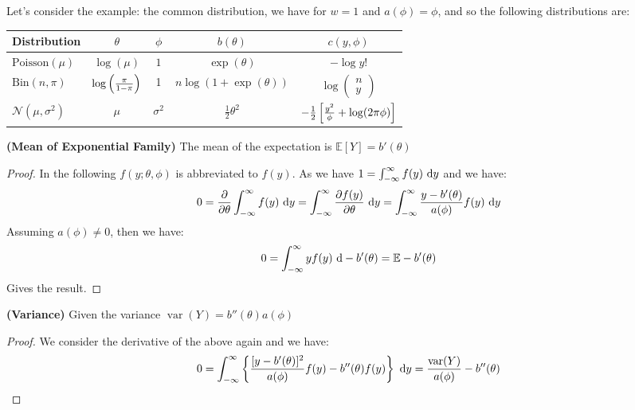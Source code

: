\begin{remark}
    Let's consider the example: the common distribution, we have for $w=1$ and $a(\phi) = \phi$, and so the following distributions are:
    \begin{table}[H]
    \centering
    \begin{tabular}{lcccc}
        \toprule
        \textbf{Distribution}   & $\theta$  & $\phi$ &  $b(\theta)$  & $c(y, \phi)$ \\
        \midrule
        $\text{Poisson}(\mu)$ & $\log(\mu)$ & $1$ & $\exp(\theta)$ & $-\log y !$ \\
        $\text{Bin}(n, \pi)$ & $\log\left( \frac{\pi}{1-\pi} \right)$ & 1 & $n\log(1+\exp(\theta))$ & $\log\begin{pmatrix}
            n \\ y
        \end{pmatrix}$ \\
        $\mathcal{N}(\mu, \sigma^2)$ & $\mu$ & $\sigma^2$ & $\frac{1}{2}\theta^2$ & $-\frac{1}{2}\left[ \frac{y^2}{\phi} + \log(2\pi\phi) \right]$ \\
        \bottomrule
    \end{tabular}
    \end{table}
\end{remark}

\begin{proposition}{\textbf{(Mean of Exponential Family)}}
    The mean of the expectation is $\mathbb{E}[Y] = b'(\theta)$
\end{proposition}
\begin{proof}
    In the following $f(y;\theta,\phi)$ is abbreviated to $f(y)$. As we have $1=\int^\infty_{-\infty}f(y)\ \mathrm{d} y$ and we have:
    \begin{equation*}
        0 = \frac{\partial}{\partial \theta} \int^\infty_{-\infty}f(y)\ \mathrm{d} y = \int^\infty_{-\infty}\frac{\partial f(y)}{\partial \theta}\ \mathrm{d} y = \int^\infty_{-\infty} \frac{y-b'(\theta)}{a(\phi)} f(y)\ \mathrm{d} y
    \end{equation*}
    Assuming $a(\phi)\ne0$, then we have:
    \begin{equation*}
        0 = \int^\infty_{-\infty}yf(y)\ \mathrm{d} - b'(\theta) = \mathbb{E} - b'(\theta)
    \end{equation*}
    Gives the result. 
\end{proof}

\begin{proposition}{\textbf{(Variance)}}
    Given the variance $\operatorname{var}(Y) = b''(\theta)a(\phi)$ 
\end{proposition}
\begin{proof}
    We consider the derivative of the above again and we have:
    \begin{equation*}
        0 = \int^\infty_{-\infty}\left\{ \frac{[y - b'(\theta)]^2}{a(\phi)}f(y) - b''(\theta)f(y)  \right\}\ \mathrm{d} y = \frac{\operatorname{var}(Y)}{a(\phi)} - b''(\theta)
    \end{equation*}
\end{proof}

